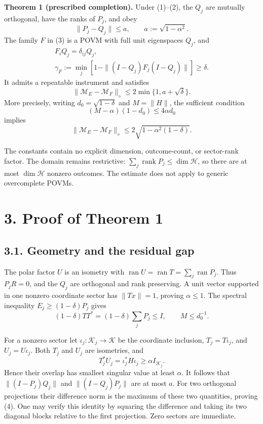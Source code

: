\documentclass[
  11pt,
  a4paper,
]{article}
\begin{document}
\textbf{Theorem 1 (prescribed completion).} Under (1)--(2), the \(Q_j\)
are mutually orthogonal, have the ranks of \(P_j\), and obey
\[\|P_j-Q_j\|\le a,\qquad a:=\sqrt{1-\alpha^2}.
\tag{4}\] The family \(F\) in (3) is a POVM with full unit eigenspaces
\(Q_j\), and \[\begin{gathered}
F_iQ_j=\delta_{ij}Q_j,\\
\gamma_F:=\min_j\left[1-\|(I-Q_j)F_j(I-Q_j)\|\right]\ge\delta.
\end{gathered}
\tag{5}\] It admits a repeatable instrument and satisfies
\[\boxed{\|\mathcal M_E-\mathcal M_F\|_\diamond
\le 2\min\{1,a+\sqrt\delta\}.}
\tag{6}\] More precisely, writing \(d_0=\sqrt{1-\delta}\) and
\(M=\|H\|\), the sufficient condition \[(M-\alpha)(1-d_0)\le4\alpha d_0
\tag{7}\] implies \[\|\mathcal M_E-\mathcal M_F\|_\diamond
\le 2\sqrt{1-\alpha^2(1-\delta)}.
\tag{8}\]

The constants contain no explicit dimension, outcome-count, or
sector-rank factor. The domain remains restrictive:
\(\sum_j\operatorname{rank}P_j\le\dim\mathcal H\), so there are at most
\(\dim\mathcal H\) nonzero outcomes. The estimate does not apply to
generic overcomplete POVMs.

\section{3. Proof of Theorem 1}\label{proof-of-theorem-1}

\subsection{3.1. Geometry and the residual
gap}\label{geometry-and-the-residual-gap}

The polar factor \(U\) is an isometry with
\(\operatorname{ran}U=\operatorname{ran}T=\sum_j\operatorname{ran}P_j\).
Thus \(P_jR=0\), and the \(Q_j\) are orthogonal and rank preserving. A
unit vector supported in one nonzero coordinate sector has \(\|Tx\|=1\),
proving \(\alpha\le1\). The spectral inequality \(E_j\ge(1-\delta)P_j\)
gives \[(1-\delta)TT^*=(1-\delta)\sum_jP_j\le I,
\qquad M\le d_0^{-1}.
\tag{9}\]

For a nonzero sector let \(\iota_j:\mathcal K_j\to\mathcal K\) be the
coordinate inclusion, \(T_j=T\iota_j\), and \(U_j=U\iota_j\). Both
\(T_j\) and \(U_j\) are isometries, and
\[T_j^*U_j=\iota_j^*H\iota_j\ge\alpha I_{\mathcal K_j}.\] Hence their
overlap has smallest singular value at least \(\alpha\). It follows that
\(\|(I-P_j)Q_j\|\) and \(\|(I-Q_j)P_j\|\) are at most \(a\). For two
orthogonal projections their difference norm is the maximum of these two
quantities, proving (4). One may verify this identity by squaring the
difference and taking its two diagonal blocks relative to the first
projection. Zero sectors are immediate.
\end{document}
